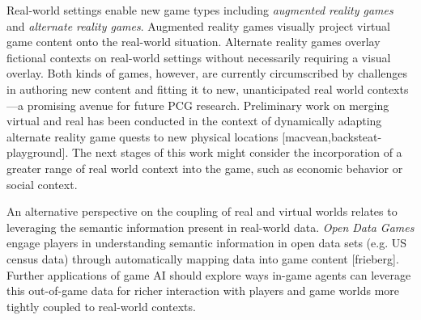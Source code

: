 \documentclass[conference]{IEEEtran}
\begin{document}
Real-world settings enable new game types including {\em augmented reality games} and {\em alternate reality games}. 
Augmented reality games visually project virtual game content onto the real-world situation.
Alternate reality games overlay fictional contexts on real-world settings without necessarily requiring a visual overlay. 
Both kinds of games, however, are currently circumscribed by challenges in authoring new content and fitting it to new, unanticipated real world contexts---a promising avenue for future PCG research. 
Preliminary work on merging virtual and real has been conducted in the context of dynamically adapting alternate reality game quests to new physical locations [macvean,backsteat-playground].
The next stages of this work might consider the incorporation of a greater range of real world context into the game, such as economic behavior or social context.

An alternative perspective on the coupling of real and virtual worlds relates to leveraging the semantic information present in real-world data. 
{\em Open Data Games} engage players in understanding semantic information in open data sets (e.g. US census data) through automatically mapping data into game content [frieberg]. 
Further applications of game AI should explore ways in-game agents can leverage this out-of-game data for richer interaction with players and game worlds more tightly coupled to real-world contexts.

\end{document}
